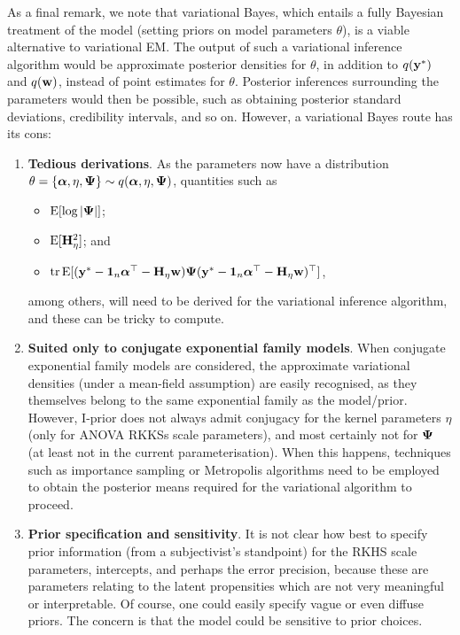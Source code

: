 \documentclass[a4paper,showframe,11pt]{report}
\begin{document}
As a final remark, we note that variational Bayes, which entails a fully Bayesian treatment of the model (setting priors on model parameters $\theta$), is a viable alternative to variational EM.
The output of such a variational inference algorithm would be approximate posterior densities for $\theta$, in addition to $q({\mathbf y}^*)$ and $q({\mathbf w})$, instead of point estimates for $\theta$.
Posterior inferences surrounding the parameters would then be possible, such as obtaining posterior standard deviations, credibility intervals, and so on.
However, a variational Bayes route has its cons:
\begin{enumerate}
  \item \textbf{Tedious derivations}. As the parameters now have a distribution $\theta = \{{\bm\alpha},\eta,{\bm\Psi}\} \sim q({\bm\alpha},\eta,{\bm\Psi})$, quantities such as
  \begin{itemize}
    \item $\operatorname{E}[\log \vert {\bm\Psi} \vert]$;
    \item $\operatorname{E}[{\mathbf H}_\eta^2]$; and
    \item $\operatorname{tr} \operatorname{E}[({\mathbf y}^*-{\mathbf 1}_n{\bm\alpha}^\top - {\mathbf H}_\eta{\mathbf w}){\bm\Psi} ({\mathbf y}^*-{\mathbf 1}_n{\bm\alpha}^\top - {\mathbf H}_\eta{\mathbf w})^\top ]$,
  \end{itemize}
  among others, will need to be derived for the variational inference algorithm, and these can be tricky to compute.
  
  \item \textbf{Suited only to conjugate exponential family models}. When conjugate exponential family models are considered, the approximate variational densities (under a mean-field assumption) are easily recognised, as they themselves belong to the same exponential family as the model/prior. However, I-prior does not always admit conjugacy for the kernel parameters $\eta$ (only for ANOVA RKKSs scale parameters), and most certainly not for ${\bm\Psi}$ (at least not in the current parameterisation). When this happens, techniques such as importance sampling or Metropolis algorithms need to be employed to obtain the posterior means required for the variational algorithm to proceed.
  
  \item \textbf{Prior specification and sensitivity}. It is not clear how best to specify prior information (from a subjectivist's standpoint) for the RKHS scale parameters, intercepts, and perhaps the error precision, because these are parameters relating to the latent propensities which are not very meaningful or interpretable. Of course, one could easily specify vague or even diffuse priors. The concern is that the model could be sensitive to prior choices.
\end{enumerate}
\end{document}
